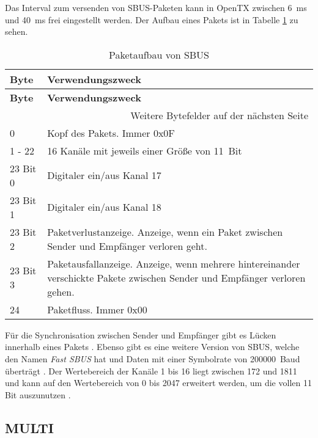 Das Interval zum versenden von SBUS-Paketen kann in OpenTX zwischen 6~ms und 40~ms frei eingestellt werden. Der Aufbau eines Pakets ist in Tabelle \ref{table:sbusPaket} zu sehen.

\begin{longtable}[c]{|p{3cm}|p{12cm}|}
    \caption{Paketaufbau von SBUS \cite{BolderFlight}}
    \label{table:sbusPaket}\\
    \hline
    \textbf{Byte} & \textbf{Verwendungszweck}\\
    \hline
    \hline
    \endfirsthead

    \hline
    \textbf{Byte} & \textbf{Verwendungszweck}\\
    \hline
    \hline
    \endhead

    \hline
    \multicolumn{2}{|r|}{Weitere Bytefelder auf der nächsten Seite}\\
    \hline
    \endfoot

    \hline
    \endlastfoot
    
    0 & Kopf des Pakets. Immer 0x0F \\
    \hline
    1 - 22 & 16 Kanäle mit jeweils einer Größe von 11~Bit \\
    \hline
    23 Bit 0 & Digitaler ein/aus Kanal 17 \\
    \hline
    23 Bit 1 & Digitaler ein/aus Kanal 18 \\
    \hline
    23 Bit 2 & Paketverlustanzeige. Anzeige, wenn ein Paket zwischen Sender und Empfänger verloren geht. \\
    \hline
    23 Bit 3 & Paketausfallanzeige. Anzeige, wenn mehrere hintereinander verschickte Pakete zwischen Sender und Empfänger verloren gehen. \\
    \hline
    24 & Paketfluss. Immer 0x00 \cite{sigrokSBus} \\
\end{longtable}

Für die Synchronisation zwischen Sender und Empfänger gibt es Lücken innerhalb eines Pakets \cite{sigrokSBus}. Ebenso gibt es eine weitere Version von SBUS, welche den Namen \textit{Fast SBUS} hat und Daten mit einer Symbolrate von 200000~Baud überträgt \cite{BolderFlight}. Der Wertebereich der Kanäle 1 bis 16 liegt zwischen 172 und 1811 und kann auf den Wertebereich von 0 bis 2047 erweitert werden, um die vollen 11 Bit auszunutzen \cite{BolderFlight}. 

\subsection{MULTI}

